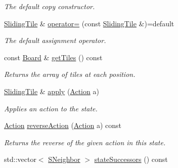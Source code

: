 \begin{DoxyCompactItemize}
\begin{DoxyCompactList}\small\item\em The default copy constructor. \end{DoxyCompactList}\item 
\hyperlink{structslb_1_1ext_1_1domain_1_1sliding__tile_1_1SlidingTile}{Sliding\+Tile} \& \hyperlink{structslb_1_1ext_1_1domain_1_1sliding__tile_1_1SlidingTile_a50235b922243e6878d1aa5044aaa48a7}{operator=} (const \hyperlink{structslb_1_1ext_1_1domain_1_1sliding__tile_1_1SlidingTile}{Sliding\+Tile} \&)=default
\begin{DoxyCompactList}\small\item\em The default assignment operator. \end{DoxyCompactList}\item 
const \hyperlink{structslb_1_1ext_1_1domain_1_1sliding__tile_1_1SlidingTile_aee77712842dd1a7162a343422b84e751}{Board} \& \hyperlink{structslb_1_1ext_1_1domain_1_1sliding__tile_1_1SlidingTile_a6d0822d1fbf4f0b89efb386e358aaab0}{get\+Tiles} () const 
\begin{DoxyCompactList}\small\item\em Returns the array of tiles at each position. \end{DoxyCompactList}\item 
\hyperlink{structslb_1_1ext_1_1domain_1_1sliding__tile_1_1SlidingTile}{Sliding\+Tile} \& \hyperlink{structslb_1_1ext_1_1domain_1_1sliding__tile_1_1SlidingTile_a343857fed30edf7784306c2e9768f476}{apply} (\hyperlink{structslb_1_1ext_1_1domain_1_1sliding__tile_1_1SlidingTile_af40ada89a9d6c41d673e1330f0849ed4}{Action} a)
\begin{DoxyCompactList}\small\item\em Applies an action to the state. \end{DoxyCompactList}\item 
\hyperlink{structslb_1_1ext_1_1domain_1_1sliding__tile_1_1SlidingTile_af40ada89a9d6c41d673e1330f0849ed4}{Action} \hyperlink{structslb_1_1ext_1_1domain_1_1sliding__tile_1_1SlidingTile_af6006ae00ad8074db8a31b7a1d74374f}{reverse\+Action} (\hyperlink{structslb_1_1ext_1_1domain_1_1sliding__tile_1_1SlidingTile_af40ada89a9d6c41d673e1330f0849ed4}{Action} a) const 
\begin{DoxyCompactList}\small\item\em Returns the reverse of the given action in this state. \end{DoxyCompactList}\item 
std\+::vector$<$ \hyperlink{structslb_1_1ext_1_1domain_1_1sliding__tile_1_1SlidingTile_a8b2f287fea14ab7e8afaf37e63b5257d}{S\+Neighbor} $>$ \hyperlink{structslb_1_1ext_1_1domain_1_1sliding__tile_1_1SlidingTile_a0485b2746a22d07955bc3fa169063a1b}{state\+Successors} () const 

\end{DoxyCompactItemize}
